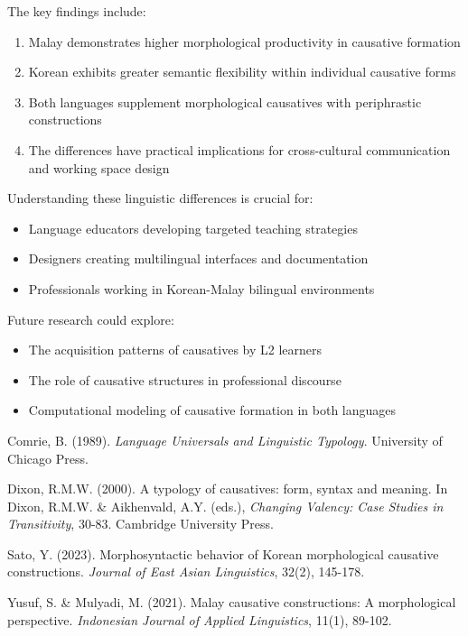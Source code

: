 \documentclass[12pt,a4paper]{article}
\begin{document}
The key findings include:

\begin{enumerate}
\item Malay demonstrates higher morphological productivity in causative formation
\item Korean exhibits greater semantic flexibility within individual causative forms
\item Both languages supplement morphological causatives with periphrastic constructions
\item The differences have practical implications for cross-cultural communication and working space design
\end{enumerate}

Understanding these linguistic differences is crucial for:
\begin{itemize}
\item Language educators developing targeted teaching strategies
\item Designers creating multilingual interfaces and documentation
\item Professionals working in Korean-Malay bilingual environments
\end{itemize}

Future research could explore:
\begin{itemize}
\item The acquisition patterns of causatives by L2 learners
\item The role of causative structures in professional discourse
\item Computational modeling of causative formation in both languages
\end{itemize}


\begin{thebibliography}{9}

Comrie, B. (1989). \textit{Language Universals and Linguistic Typology}. University of Chicago Press.

Dixon, R.M.W. (2000). A typology of causatives: form, syntax and meaning. In Dixon, R.M.W. \& Aikhenvald, A.Y. (eds.), \textit{Changing Valency: Case Studies in Transitivity}, 30-83. Cambridge University Press.

Sato, Y. (2023). Morphosyntactic behavior of Korean morphological causative constructions. \textit{Journal of East Asian Linguistics}, 32(2), 145-178.

Yusuf, S. \& Mulyadi, M. (2021). Malay causative constructions: A morphological perspective. \textit{Indonesian Journal of Applied Linguistics}, 11(1), 89-102.

\end{thebibliography}
\end{document}
